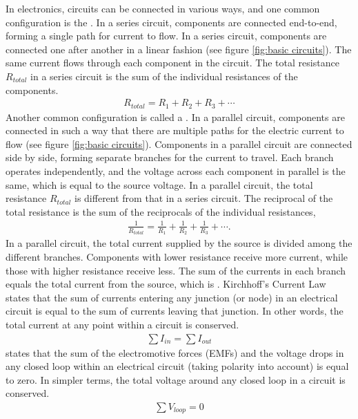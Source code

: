 In electronics, circuits can be connected in various ways, and one common configuration is the . In a series circuit, components are connected end-to-end, forming a single path for current to flow. In a series circuit, components are connected one after another in a linear fashion (see figure \ref{fig:basic circuits}). The same current flows through each component in the circuit. The total resistance $R_{total}$ in a series circuit is the sum of the individual resistances of the components.
\begin{align}
R_{total} = R_1 + R_2 + R_3 + \cdots
\end{align}
Another common configuration is called a . In a parallel circuit, components are connected in such a way that there are multiple paths for the electric current to flow (see figure \ref{fig:basic circuits}). Components in a parallel circuit are connected side by side, forming separate branches for the current to travel. Each branch operates independently, and the voltage across each component in parallel is the same, which is equal to the source voltage. In a parallel circuit, the total resistance \(R_{total}\) is different from that in a series circuit. The reciprocal of the total resistance is the sum of the reciprocals of the individual resistances,
\begin{align}
\frac{1}{R_{total}} = \frac{1}{R_1} + \frac{1}{R_2} + \frac{1}{R_3} + \cdots.
\end{align}
In a parallel circuit, the total current supplied by the source is divided among the different branches. Components with lower resistance receive more current, while those with higher resistance receive less. The sum of the currents in each branch equals the total current from the source, which is . Kirchhoff's Current Law states that the sum of currents entering any junction (or node) in an electrical circuit is equal to the sum of currents leaving that junction. In other words, the total current at any point within a circuit is conserved.
\begin{align}
\sum I_{in} = \sum I_{out}
\end{align}
 states that the sum of the electromotive forces (EMFs) and the voltage drops in any closed loop within an electrical circuit (taking polarity into account) is equal to zero. In simpler terms, the total voltage around any closed loop in a circuit is conserved.
\begin{align}
\sum V_{loop} = 0
\end{align}

